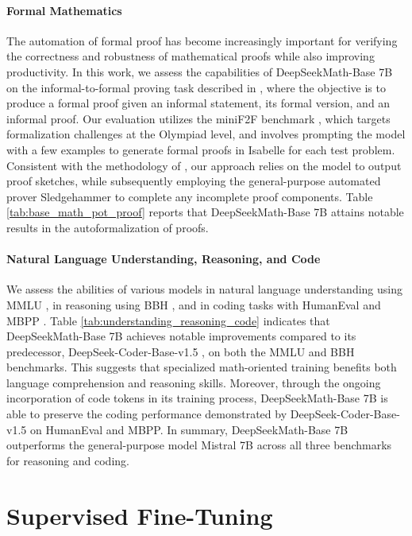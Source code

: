 \begin{itemize}[topsep=0pt]
\paragraph{Formal Mathematics}

The automation of formal proof has become increasingly important for verifying the correctness and robustness of mathematical proofs while also improving productivity. In this work, we assess the capabilities of DeepSeekMath-Base 7B on the informal-to-formal proving task described in \citep{dsp_proof}, where the objective is to produce a formal proof given an informal statement, its formal version, and an informal proof. Our evaluation utilizes the miniF2F benchmark \citep{minif2f}, which targets formalization challenges at the Olympiad level, and involves prompting the model with a few examples to generate formal proofs in Isabelle for each test problem. Consistent with the methodology of \cite{dsp_proof}, our approach relies on the model to output proof sketches, while subsequently employing the general-purpose automated prover Sledgehammer \citep{sledgehammer} to complete any incomplete proof components. Table \ref{tab:base_math_pot_proof} reports that DeepSeekMath-Base 7B attains notable results in the autoformalization of proofs.

\paragraph{Natural Language Understanding, Reasoning, and Code}

We assess the abilities of various models in natural language understanding using MMLU \citep{mmlu}, in reasoning using BBH \citep{bbh}, and in coding tasks with HumanEval \citep{codex} and MBPP \citep{mbpp}. Table \ref{tab:understanding_reasoning_code} indicates that DeepSeekMath-Base 7B achieves notable improvements compared to its predecessor, DeepSeek-Coder-Base-v1.5 \citep{deepseek-coder}, on both the MMLU and BBH benchmarks. This suggests that specialized math-oriented training benefits both language comprehension and reasoning skills. Moreover, through the ongoing incorporation of code tokens in its training process, DeepSeekMath-Base 7B is able to preserve the coding performance demonstrated by DeepSeek-Coder-Base-v1.5 on HumanEval and MBPP. In summary, DeepSeekMath-Base 7B outperforms the general-purpose model Mistral 7B \citep{mistral} across all three benchmarks for reasoning and coding.

\section{Supervised Fine-Tuning}


\end{itemize}
